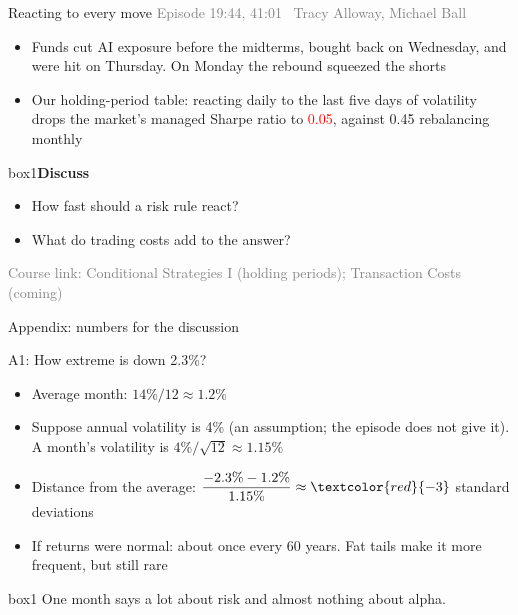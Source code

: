 \documentclass[aspectratio=169,10pt]{beamer}
\newcommand{\src}[1]{{\footnotesize\textcolor{gray}{Episode #1}}\par\vskip 6pt}
\newcommand{\course}[1]{{\footnotesize\textcolor{gray}{Course link: #1}}}
\newenvironment{discuss}{\begin{beamercolorbox}[rounded=true,sep=8pt]{box1}\textbf{Discuss}\par\vskip 3pt}{\end{beamercolorbox}}
\begin{document}
\begin{frame}[label=q10]{Reacting to every move}
\src{19:44, 41:01 \textbullet\ Tracy Alloway, Michael Ball}
\begin{itemize}
\item Funds cut AI exposure before the midterms, bought back on Wednesday, and were hit on Thursday. On Monday the rebound squeezed the shorts
\vskip 6pt
\item Our holding-period table: reacting daily to the last five days of volatility drops the market's managed Sharpe ratio to \textcolor{red}{0.05}, against 0.45 rebalancing monthly
\end{itemize}
\vskip 10pt
\begin{discuss}
\begin{itemize}
\item How fast should a risk rule react?
\item What do trading costs add to the answer?
\end{itemize}
\end{discuss}
\vfill
\course{Conditional Strategies I (holding periods); Transaction Costs (coming)}
\end{frame}

\appendix
\begin{frame}
\begin{center}
{\Large Appendix: numbers for the discussion}
\end{center}
\end{frame}

\begin{frame}[label=appendix_z]{A1: How extreme is down 2.3\%?}
\begin{itemize}
\item Average month: $14\% / 12 \approx 1.2\%$
\vskip 6pt
\item Suppose annual volatility is 4\% (an assumption; the episode does not give it). A month's volatility is $4\% / \sqrt{12} \approx 1.15\%$
\vskip 6pt
\item Distance from the average: $\dfrac{-2.3\% - 1.2\%}{1.15\%} \approx \textcolor{red}{-3}$ standard deviations
\vskip 6pt
\item If returns were normal: about once every 60 years. Fat tails make it more frequent, but still rare
\end{itemize}
\vskip 10pt
\begin{beamercolorbox}[rounded=true,sep=8pt,center]{box1}
One month says a lot about risk and almost nothing about alpha.
\end{beamercolorbox}
\vskip 5pt
\hfill \hyperlink{q1}{}
\end{frame}
\end{document}
